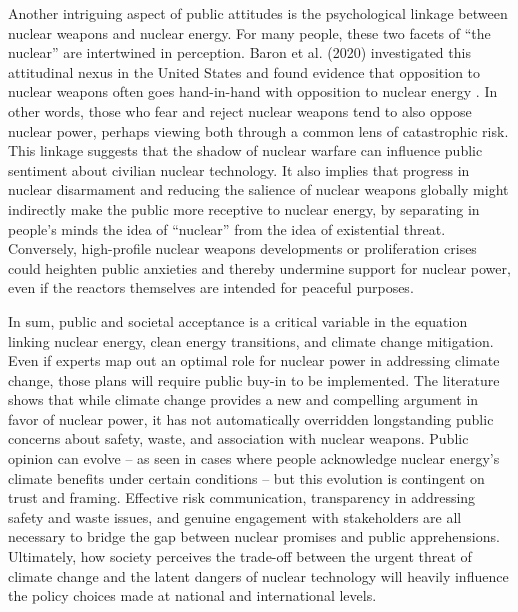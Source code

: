 \documentclass[11,5 pt]{article}
\begin{document}
Another intriguing aspect of public attitudes is the psychological linkage between nuclear weapons and nuclear energy. For many people, these two facets of “the nuclear” are intertwined in perception. Baron et al. (2020) investigated this attitudinal nexus in the United States and found evidence that opposition to nuclear weapons often goes hand-in-hand with opposition to nuclear energy \cite{BARON2020101567}. In other words, those who fear and reject nuclear weapons tend to also oppose nuclear power, perhaps viewing both through a common lens of catastrophic risk. This linkage suggests that the shadow of nuclear warfare can influence public sentiment about civilian nuclear technology. It also implies that progress in nuclear disarmament and reducing the salience of nuclear weapons globally might indirectly make the public more receptive to nuclear energy, by separating in people’s minds the idea of “nuclear” from the idea of existential threat. Conversely, high-profile nuclear weapons developments or proliferation crises could heighten public anxieties and thereby undermine support for nuclear power, even if the reactors themselves are intended for peaceful purposes.

In sum, public and societal acceptance is a critical variable in the equation linking nuclear energy, clean energy transitions, and climate change mitigation. Even if experts map out an optimal role for nuclear power in addressing climate change, those plans will require public buy-in to be implemented. The literature shows that while climate change provides a new and compelling argument in favor of nuclear power, it has not automatically overridden longstanding public concerns about safety, waste, and association with nuclear weapons. Public opinion can evolve – as seen in cases where people acknowledge nuclear energy’s climate benefits under certain conditions – but this evolution is contingent on trust and framing. Effective risk communication, transparency in addressing safety and waste issues, and genuine engagement with stakeholders are all necessary to bridge the gap between nuclear promises and public apprehensions. Ultimately, how society perceives the trade-off between the urgent threat of climate change and the latent dangers of nuclear technology will heavily influence the policy choices made at national and international levels.

\newpage

\printbibliography
\end{document}
